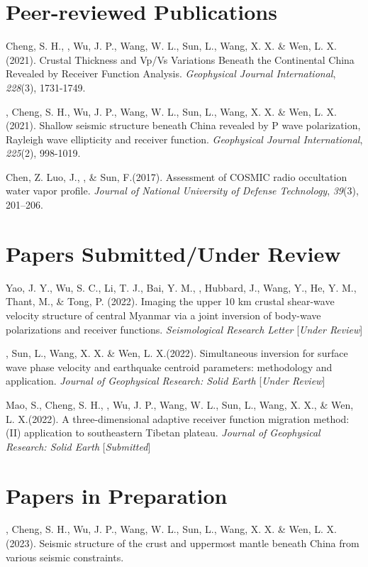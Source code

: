 \newcommand{\Revision}{\textit{under revision}}
\newcommand{\CS}{*} %
\newcommand{\CF}{\textsuperscript{\#}} %


\section*{Peer-reviewed Publications}

\begin{etaremune}
\item
    Cheng, S. H., \Xiao, Wu, J. P., Wang, W. L., Sun, L., Wang, X. X. \& Wen, L. X.(2021).
    Crustal Thickness and Vp/Vs Variations Beneath the Continental China Revealed by Receiver Function Analysis.
    \textit{Geophysical Journal International}, \textit{228}(3), 1731-1749.  
\item
    \Xiao, Cheng, S. H., Wu, J. P., Wang, W. L., Sun, L., Wang, X. X. \& Wen, L. X.(2021).
    Shallow seismic structure beneath China revealed by P wave polarization, Rayleigh wave ellipticity and receiver function.
    \textit{Geophysical Journal International}, \textit{225}(2), 998-1019. 
\item
    Chen, Z. Luo, J.,  \Xiao, \& Sun, F.(2017).
    Assessment of COSMIC radio occultation water vapor profile.
    \textit{Journal of National University of Defense Technology}, \textit{39}(3), 201--206.
\end{etaremune}

\section*{Papers Submitted/Under Review}
\begin{etaremune}
\item
    Yao, J. Y., Wu, S. C., Li, T. J., Bai, Y. M., \Xiao, Hubbard, J., Wang, Y., He, Y. M., Thant, M., \& Tong, P. (2022).
    Imaging the upper 10 km crustal shear-wave velocity structure of central Myanmar via a joint inversion of body-wave polarizations and receiver functions.
    \textit{Seismological Research Letter} [\textit{Under Review}]
\item
    \Xiao, Sun, L., Wang, X. X. \& Wen, L. X.(2022).
    Simultaneous inversion for surface wave phase velocity and earthquake centroid parameters: methodology and application.
    \textit{Journal of Geophysical Research: Solid Earth} [\textit{Under Review}]
\item
    Mao, S., Cheng, S. H., \Xiao, Wu, J. P., Wang, W. L., Sun, L., Wang, X. X., \& Wen, L. X.(2022).
    A three-dimensional adaptive receiver function migration method: (II) application to southeastern Tibetan plateau.
    \textit{Journal of Geophysical Research: Solid Earth} [\textit{Submitted}]
\end{etaremune}

\section*{Papers in Preparation}
\begin{etaremune}
\item
    \Xiao, Cheng, S. H., Wu, J. P., Wang, W. L., Sun, L., Wang, X. X. \& Wen, L. X.(2023).
    Seismic structure of the crust and uppermost mantle beneath China from various seismic constraints.
\end{etaremune}

